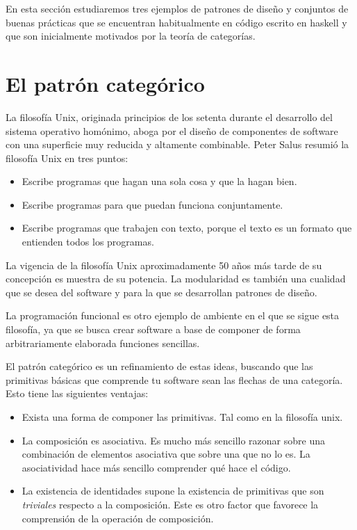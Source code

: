En esta sección estudiaremos tres ejemplos de patrones de diseño
y conjuntos de
buenas prácticas que se encuentran habitualmente en código escrito
en haskell y que son inicialmente motivados por la teoría de
categorías.

\section{El patrón categórico}
La filosofía Unix, originada
principios de los setenta durante el desarrollo del sistema
operativo homónimo, aboga por el
diseño de componentes de software con una superficie muy reducida
y altamente combinable. Peter Salus resumió la filosofía Unix
en tres puntos:
\begin{itemize}
\item Escribe programas que hagan una sola cosa y que la hagan bien.
\item Escribe programas para que puedan funciona conjuntamente.
\item Escribe programas que trabajen con texto, porque el texto
  es un formato que entienden todos los programas.
\end{itemize}
La vigencia de la filosofía Unix aproximadamente 50 años más
tarde de su concepción es muestra de su potencia. La modularidad
es también una cualidad que se desea del software y para la que
se desarrollan patrones de diseño.

La programación funcional es otro ejemplo de ambiente en el que
se sigue esta filosofía, ya que se busca crear software
a base de componer de forma arbitrariamente elaborada
funciones sencillas.

El patrón categórico es un refinamiento de estas ideas, buscando
que las primitivas básicas que comprende tu software sean las
flechas de una categoría. Esto tiene las siguientes ventajas:
\begin{itemize}
\item Exista una forma de componer las primitivas. Tal como
  en la filosofía unix.
\item La composición es asociativa. Es mucho más sencillo razonar
  sobre una combinación de elementos asociativa que sobre una
  que no lo es. La asociatividad hace más sencillo comprender
  qué hace el código.

\item La existencia de identidades supone la existencia de primitivas
  que son \textit{triviales} respecto a la composición. Este es
  otro factor que favorece
  la comprensión de la operación de composición.
\end{itemize}

